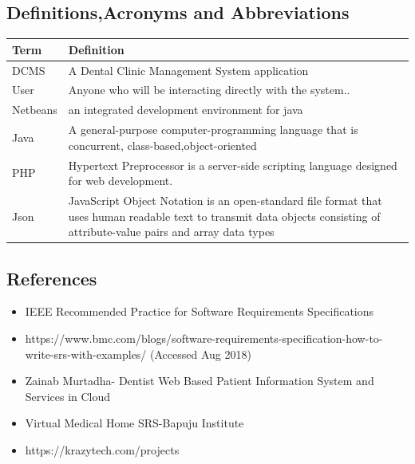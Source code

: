 \documentclass[12pt]{article}
\begin{document}
\subsection{Definitions,Acronyms and Abbreviations}
\begin{tabular}{|p{3cm}|p{9cm}|}
\hline
\textbf{Term} & \textbf{Definition}\\
\hline
DCMS &  A Dental Clinic Management System application\\
\hline
User &  Anyone who will be interacting directly with the system..\\
\hline
Netbeans & an integrated development environment for java\\
\hline
Java & A general-purpose computer-programming language that is concurrent, class-based,object-oriented\\
\hline
PHP & Hypertext Preprocessor is a server-side scripting language designed for web development. \\
\hline
Json & JavaScript Object Notation is an open-standard file format that uses human readable text to transmit data objects consisting of attribute-value pairs and array data types \\
\hline
\end{tabular}

\subsection{References}
\begin{itemize}
    \item    
    IEEE Recommended Practice for Software Requirements Specifications
    \item
    https://www.bmc.com/blogs/software-requirements-specification-how-to-write-srs-with-examples/ (Accessed Aug 2018)
    \item
    Zainab Murtadha- Dentist Web Based Patient Information System and Services in Cloud
    \item
    Virtual Medical Home SRS-Bapuju Institute
    \item
    https://krazytech.com/projects
    \end{itemize}
    \newpage
\end{document}
